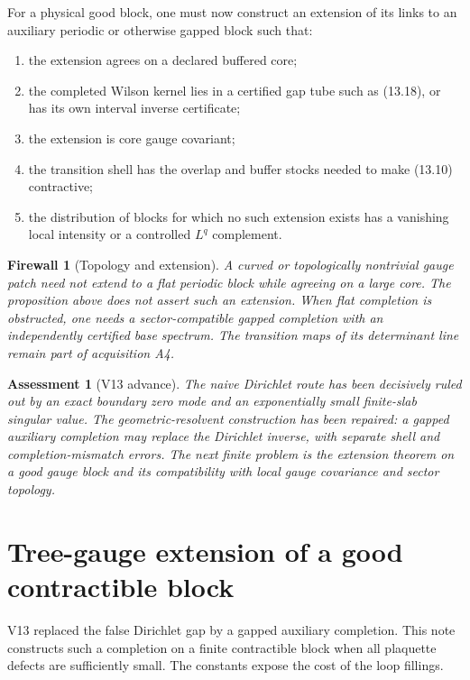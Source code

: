\documentclass[11pt]{article}
\newtheorem{assessment}[theorem]{Assessment}
\newtheorem{firewall}[theorem]{Firewall}
\begin{document}
For a physical good block, one must now construct an extension of its
links to an auxiliary periodic or otherwise gapped block such that:
\begin{enumerate}[label=\textnormal{(E\arabic*)}]
\item the extension agrees on a declared buffered core;
\item the completed Wilson kernel lies in a certified gap tube such as
(13.18), or has its own interval inverse certificate;
\item the extension is core gauge covariant;
\item the transition shell has the overlap and buffer stocks needed to
make (13.10) contractive;
\item the distribution of blocks for which no such extension exists has
a vanishing local intensity or a controlled \(L^q\) complement.
\end{enumerate}

\begin{firewall}[Topology and extension]
\label{fw:v11v13-topology}
A curved or topologically nontrivial gauge patch need not extend to a
flat periodic block while agreeing on a large core.  The proposition above
does not assert such an extension.  When flat completion is obstructed,
one needs a sector-compatible gapped completion with an independently
certified base spectrum.  The transition maps of its determinant line
remain part of acquisition A4.
\end{firewall}

\begin{assessment}[V13 advance]
\label{ass:v11v13}
The naive Dirichlet route has been decisively ruled out by an exact
boundary zero mode and an exponentially small finite-slab singular value.
The geometric-resolvent construction has been repaired: a gapped
auxiliary completion may replace the Dirichlet inverse, with separate
shell and completion-mismatch errors.  The next finite problem is the
extension theorem on a good gauge block and its compatibility with local
gauge covariance and sector topology.
\end{assessment}


\section{Tree-gauge extension of a good contractible block}
\label{sec:v11v14}

V13 replaced the false Dirichlet gap by a gapped auxiliary completion.
This note constructs such a completion on a finite contractible block when
all plaquette defects are sufficiently small.  The constants expose the
cost of the loop fillings.
\end{document}
